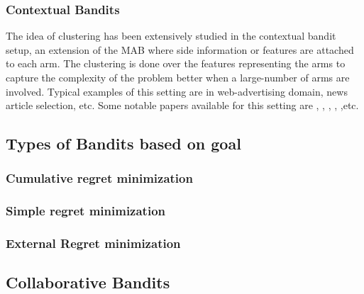 \subsubsection{Contextual Bandits}

The idea of clustering has been extensively studied in the contextual bandit setup, an extension of the MAB where side information or features are attached to each arm. The clustering is done over the features representing the arms to capture the complexity of the problem better when a large-number of arms are involved. Typical examples of this setting are in web-advertising domain, news article selection, etc. Some notable papers available for this setting are   \citet{auer2002using}, \citet{langford2008epoch}, \citet{li2010contextual}, \citet{beygelzimer2011contextual}, \citet{slivkins2014contextual},etc. 


%





\subsection{Types of Bandits based on goal}



\subsubsection{Cumulative regret minimization}



\subsubsection{Simple regret minimization}



\subsubsection{External Regret minimization}



\subsection{Collaborative Bandits}

